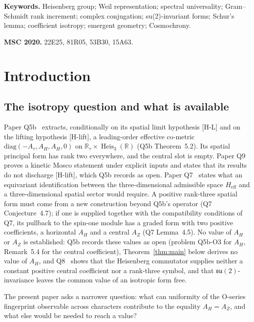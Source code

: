 \documentclass[12pt,a4paper]{article}
\theoremstyle{definition}
\theoremstyle{remark}
\DeclareMathOperator{\Heis}{Heis}
\newcommand{\Heff}{H_{\mathrm{eff}}}
\begin{document}
  \bigskip
  \noindent\textbf{Keywords.}
  Heisenberg group; Weil representation; spectral universality; Gram--Schmidt rank increment; complex conjugation;
  su(2)-invariant forms; Schur's lemma; coefficient isotropy; emergent geometry; Cosmochrony.

  \noindent\textbf{MSC 2020.}
  22E25, 81R05, 53B30, 15A63.

  \clearpage
  \tableofcontents
  \clearpage

  \section{Introduction}

    \subsection{The isotropy question and what is available}

      Paper Q5b~\cite{Beau2026q5b} extracts, conditionally on its spatial limit hypothesis [H-L] and on the lifting
      hypothesis [H-lift], a leading-order effective co-metric $\mathrm{diag}(-A_\tau, A_H, A_H, 0)$ on
      $\mathbb{R}_\tau \times \Heis_3(\mathbb{R})$ (Q5b Theorem~5.2).
      Its spatial principal form has rank two everywhere, and the central slot is empty.
      Paper Q9~\cite{Beau2026q9} proves a kinetic Mosco statement under explicit inputs and states that its results
      do not discharge [H-lift], which Q5b records as open.
      Paper Q7~\cite{Beau2026q7} states what an equivariant identification between the three-dimensional admissible
      space $\Heff$ and a three-dimensional spatial sector would require.
      A positive rank-three spatial form must come from a new construction beyond Q5b's operator (Q7
      Conjecture~4.7); if one is supplied together with the compatibility conditions of Q7, its pullback to the
      spin-one module has a graded form with two positive coefficients, a horizontal $A_H$ and a central $A_Z$
      (Q7 Lemma~4.5).
      No value of $A_H$ or $A_Z$ is established: Q5b records these values as open (problem Q5b-O3 for $A_H$,
      Remark~5.4 for the central coefficient),
      Theorem~\ref{thm:main} below derives no value of $A_H$, and Q8~\cite{BeauQ8} shows that the Heisenberg
      commutator supplies neither a constant positive central
      coefficient nor a rank-three symbol, and that $\mathfrak{su}(2)$-invariance leaves the common value of an
      isotropic form free.

      The present paper asks a narrower question: what can uniformity of the O-series fingerprint observable across
      characters contribute to the equality $A_H = A_Z$, and what else would be needed to reach a value?
\end{document}
